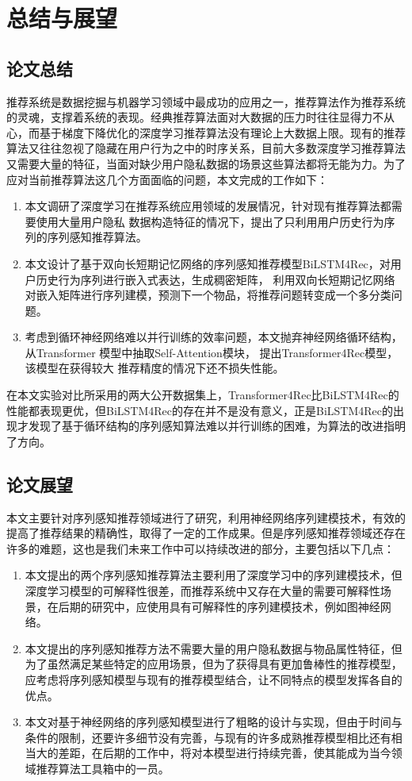 ﻿%
\chapter{总结与展望}
\label{chap:conclusion}

\section{论文总结}
推荐系统是数据挖掘与机器学习领域中最成功的应用之一，推荐算法作为推荐系统的灵魂，支撑着系统的表现。经典推荐算法面对大数据的压力时往往显得力不从心，而基于梯度下降优化的深度学习推荐算法没有理论上大数据上限。现有的推荐算法又往往忽视了隐藏在用户行为之中的时序关系，目前大多数深度学习推荐算法又需要大量的特征，当面对缺少用户隐私数据的场景这些算法都将无能为力。为了应对当前推荐算法这几个方面面临的问题，本文完成的工作如下：
\begin{enumerate}
    \item 本文调研了深度学习在推荐系统应用领域的发展情况，针对现有推荐算法都需要使用大量用户隐私%
          数据构造特征的情况下，提出了只利用用户历史行为序列的序列感知推荐算法。
    \item 本文设计了基于双向长短期记忆网络的序列感知推荐模型BiLSTM4Rec，对用户历史行为序列进行嵌入式表达，生成稠密矩阵，%
          利用双向长短期记忆网络对嵌入矩阵进行序列建模，预测下一个物品，将推荐问题转变成一个多分类问题。
    \item 考虑到循环神经网络难以并行训练的效率问题，本文抛弃神经网络循环结构，从Transformer
    	  模型中抽取Self-Attention模块，%
          提出Transformer4Rec模型，该模型在获得较大%
          推荐精度的情况下还不损失性能。
\end{enumerate}
在本文实验对比所采用的两大公开数据集上，Transformer4Rec比BiLSTM4Rec的性能都表现更优，但BiLSTM4Rec的存在并不是没有意义，正是BiLSTM4Rec的出现才发现了基于循环结构的序列感知算法难以并行训练的困难，为算法的改进指明了方向。

\section{论文展望}

本文主要针对序列感知推荐领域进行了研究，利用神经网络序列建模技术，有效的提高了推荐结果的精确性，取得了一定的工作成果。但是序列感知推荐领域还存在许多的难题，这也是我们未来工作中可以持续改进的部分，主要包括以下几点：
\begin{enumerate}
    \item 本文提出的两个序列感知推荐算法主要利用了深度学习中的序列建模技术，但深度学习模型的可解释性很差，而推荐系统中又存在大量的需要可解释性场景，在后期的研究中，应使用具有可解释性的序列建模技术，例如图神经网络。
    \item 本文提出的序列感知推荐方法不需要大量的用户隐私数据与物品属性特征，但为了虽然满足某些特定的应用场景，但为了获得具有更加鲁棒性的推荐模型，应考虑将序列感知模型与现有的推荐模型结合，让不同特点的模型发挥各自的优点。
    \item 本文对基于神经网络的序列感知模型进行了粗略的设计与实现，但由于时间与条件的限制，还要许多细节没有完善，与现有的许多成熟推荐模型相比还有相当大的差距，在后期的工作中，将对本模型进行持续完善，使其能成为当今领域推荐算法工具箱中的一员。
\end{enumerate}
